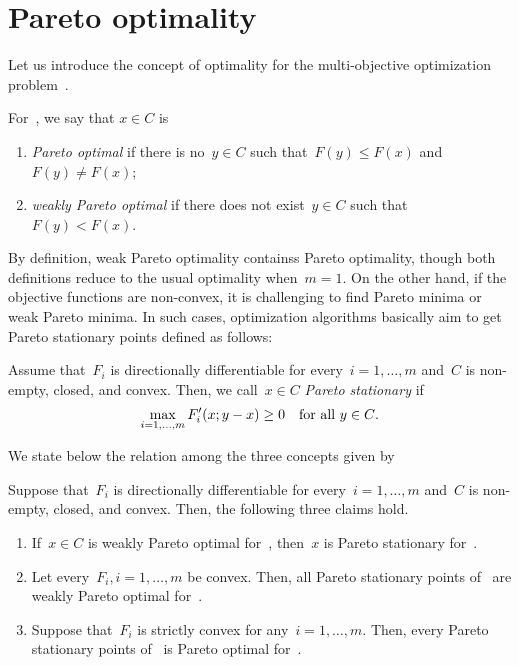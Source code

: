 \documentclass[../main]{subfiles}
\begin{document}
\section{Pareto optimality}
Let us introduce the concept of optimality for the multi-objective optimization problem~.
\begin{definition} 
    For~, we say that $x \in C$ is
    \begin{enumerate}
        \item \emph{Pareto optimal} if there is no~$y \in C$ such that~$F(y) \le F(x)$ and~$F(y) \neq F(x)$; 
        \item \emph{weakly Pareto optimal} if there does not exist~$y \in C$ such that~$F(y) < F(x)$. 
    \end{enumerate}
\end{definition}
By definition, weak Pareto optimality containss Pareto optimality, though both definitions reduce to the usual optimality when~$m = 1$.
On the other hand, if the objective functions are non-convex, it is challenging to find Pareto minima or weak Pareto minima.
In such cases, optimization algorithms basically aim to get Pareto stationary points defined as follows:
\begin{definition} 
    Assume that~$F_i$ is directionally differentiable for every~$i = 1, \dots, m$ and~$C$ is non-empty, closed, and convex.
    Then, we call~$x \in C$ \emph{Pareto stationary} if~
    \begin{equation}
        \max_{i = 1, \dots, m} F_i'(x; y - x) \ge 0 \quad \text{for all~$y \in C$}
    .\end{equation} 
\end{definition}
We state below the relation among the three concepts given by~
\begin{lemma} 
    Suppose that~$F_i$ is directionally differentiable for every~$i = 1, \dots, m$ and~$C$ is non-empty, closed, and convex.
    Then, the following three claims hold.
    \begin{enumerate}
        \item If~$x \in C$ is weakly Pareto optimal for~, then~$x$ is Pareto stationary for~. 
        \item Let every~$F_i, i = 1, \dots, m$ be convex. Then, all Pareto stationary points of~ are weakly Pareto optimal for~. 
        \item Suppose that~$F_i$ is strictly convex for any~$i = 1, \dots, m$. Then, every Pareto stationary points of~ is Pareto optimal for~. 
    \end{enumerate}
\end{lemma}
\end{document}
